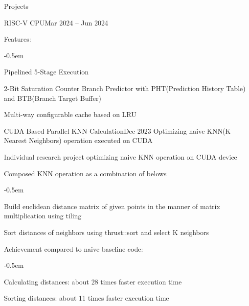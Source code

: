 \documentclass{resume}
\begin{document}
\begin{rSection}{Projects}
\begin{rSubsection}{RISC-V CPU}{Mar 2024 -- Jun 2024}
        \item Features:
        \vspace{-0.5em}
        \begin{list}{--}{\setlength{\rightmargin}{1.5em}}
            \itemsep -0.5em

            \item Pipelined 5-Stage Execution

            \item 2-Bit Saturation Counter Branch Predictor with PHT(Prediction History Table) and BTB(Branch Target Buffer)

            \item Multi-way configurable cache based on LRU
        \end{list}
    \end{rSubsection}

    \begin{rSubsection}{CUDA Based Parallel KNN Calculation}{Dec 2023}
        Optimizing naive KNN(K Nearest Neighbors) operation executed on CUDA

        \item Individual research project optimizing naive KNN operation on CUDA device

        \item Composed KNN operation as a combination of belows
        \vspace{-0.5em}
        \begin{list}{--}{\setlength{\rightmargin}{1.5em}}
            \itemsep -0.5em

            \item Build euclidean distance matrix of given points in the manner of matrix multiplication using tiling

            \item Sort distances of neighbors using thrust::sort and select K neighbors
        \end{list}

        \item Achievement compared to naive baseline code:
        \vspace{-0.5em}
        \begin{list}{--}{\setlength{\rightmargin}{1.5em}}
            \itemsep -0.5em

            \item Calculating distances: about 28 times faster execution time

            \item Sorting distances: about 11 times faster execution time
        \end{list}
    \end{rSubsection}


\end{rSection}
\end{document}
